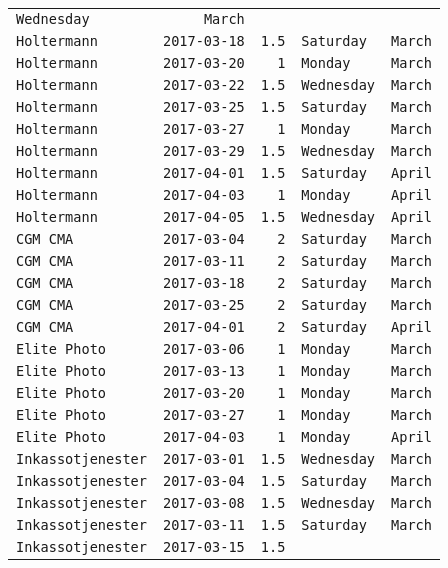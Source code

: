 \documentclass[11pt,A4paper,]{article}
\begin{document}
\begin{longtable}[]{@{}lrrll@{}}
\texttt{Wednesday} & \texttt{March}\tabularnewline
\texttt{Holtermann} & \texttt{2017-03-18} & \texttt{1.5} &
\texttt{Saturday} & \texttt{March}\tabularnewline
\texttt{Holtermann} & \texttt{2017-03-20} & \texttt{1} & \texttt{Monday}
& \texttt{March}\tabularnewline
\texttt{Holtermann} & \texttt{2017-03-22} & \texttt{1.5} &
\texttt{Wednesday} & \texttt{March}\tabularnewline
\texttt{Holtermann} & \texttt{2017-03-25} & \texttt{1.5} &
\texttt{Saturday} & \texttt{March}\tabularnewline
\texttt{Holtermann} & \texttt{2017-03-27} & \texttt{1} & \texttt{Monday}
& \texttt{March}\tabularnewline
\texttt{Holtermann} & \texttt{2017-03-29} & \texttt{1.5} &
\texttt{Wednesday} & \texttt{March}\tabularnewline
\texttt{Holtermann} & \texttt{2017-04-01} & \texttt{1.5} &
\texttt{Saturday} & \texttt{April}\tabularnewline
\texttt{Holtermann} & \texttt{2017-04-03} & \texttt{1} & \texttt{Monday}
& \texttt{April}\tabularnewline
\texttt{Holtermann} & \texttt{2017-04-05} & \texttt{1.5} &
\texttt{Wednesday} & \texttt{April}\tabularnewline
\texttt{CGM\ CMA} & \texttt{2017-03-04} & \texttt{2} & \texttt{Saturday}
& \texttt{March}\tabularnewline
\texttt{CGM\ CMA} & \texttt{2017-03-11} & \texttt{2} & \texttt{Saturday}
& \texttt{March}\tabularnewline
\texttt{CGM\ CMA} & \texttt{2017-03-18} & \texttt{2} & \texttt{Saturday}
& \texttt{March}\tabularnewline
\texttt{CGM\ CMA} & \texttt{2017-03-25} & \texttt{2} & \texttt{Saturday}
& \texttt{March}\tabularnewline
\texttt{CGM\ CMA} & \texttt{2017-04-01} & \texttt{2} & \texttt{Saturday}
& \texttt{April}\tabularnewline
\texttt{Elite\ Photo} & \texttt{2017-03-06} & \texttt{1} &
\texttt{Monday} & \texttt{March}\tabularnewline
\texttt{Elite\ Photo} & \texttt{2017-03-13} & \texttt{1} &
\texttt{Monday} & \texttt{March}\tabularnewline
\texttt{Elite\ Photo} & \texttt{2017-03-20} & \texttt{1} &
\texttt{Monday} & \texttt{March}\tabularnewline
\texttt{Elite\ Photo} & \texttt{2017-03-27} & \texttt{1} &
\texttt{Monday} & \texttt{March}\tabularnewline
\texttt{Elite\ Photo} & \texttt{2017-04-03} & \texttt{1} &
\texttt{Monday} & \texttt{April}\tabularnewline
\texttt{Inkassotjenester} & \texttt{2017-03-01} & \texttt{1.5} &
\texttt{Wednesday} & \texttt{March}\tabularnewline
\texttt{Inkassotjenester} & \texttt{2017-03-04} & \texttt{1.5} &
\texttt{Saturday} & \texttt{March}\tabularnewline
\texttt{Inkassotjenester} & \texttt{2017-03-08} & \texttt{1.5} &
\texttt{Wednesday} & \texttt{March}\tabularnewline
\texttt{Inkassotjenester} & \texttt{2017-03-11} & \texttt{1.5} &
\texttt{Saturday} & \texttt{March}\tabularnewline
\texttt{Inkassotjenester} & \texttt{2017-03-15} & \texttt{1.5} &

\end{longtable}
\end{document}
